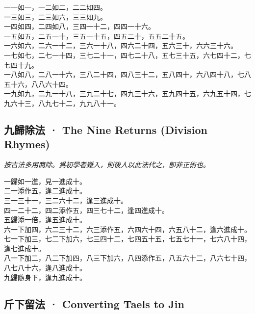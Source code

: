 \documentclass[11pt,a4paper]{article}
\begin{document}
\noindent
一一如一，一二如二，二二如四。\\[2pt]
一三如三，二三如六，三三如九。\\[2pt]
一四如四，二四如八，三四一十二，四四一十六。\\[2pt]
一五如五，二五一十，三五一十五，四五二十，五五二十五。\\[2pt]
一六如六，二六一十二，三六一十八，四六二十四，五六三十，六六三十六。\\[2pt]
一七如七，二七一十四，三七二十一，四七二十八，五七三十五，六七四十二，七七四十九。\\[2pt]
一八如八，二八一十六，三八二十四，四八三十二，五八四十，六八四十八，七八五十六，八八六十四。\\[2pt]
一九如九，二九一十八，三九二十七，四九三十六，五九四十五，六九五十四，七九六十三，八九七十二，九九八十一。

\subsection{九歸除法 · The Nine Returns (Division Rhymes)}

\textit{按古法多用商除。爲初學者難入，則後人以此法代之，卽非正術也。}

\medskip

\noindent
一歸如一進，見一進成十。\\[2pt]
二一添作五，逢二進成十。\\[2pt]
三一三十一，三二六十二，逢三進成十。\\[2pt]
四一二十二，四二添作五，四三七十二，逢四進成十。\\[2pt]
五歸添一倍，逢五進成十。\\[2pt]
六一下加四，六二三十二，六三添作五，六四六十四，六五八十二，逢六進成十。\\[2pt]
七一下加三，七二下加六，七三四十二，七四五十五，七五七十一，七六八十四，逢七進成十。\\[2pt]
八一下加二，八二下加四，八三下加六，八四添作五，八五六十二，八六七十四，八七八十六，逢八進成十。\\[2pt]
九歸隨身下，逢九進成十。

\subsection{斤下留法 · Converting Taels to Jin}
\end{document}
